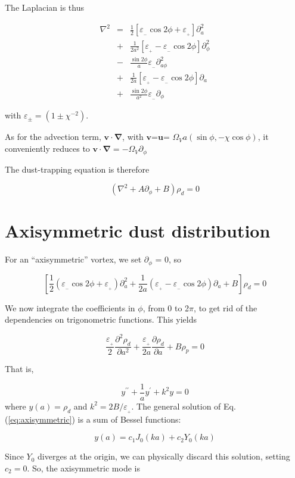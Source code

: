 \documentclass[apj]{emulateapj}
\newcommand{\pderiv}[2]{\frac{\partial #1}{\partial #2}}
\newcommand{\pderivn}[3]{\frac{\partial^{#3} #1}{\partial #2^{#3}}}
\renewcommand{\v}[1]{{\boldsymbol{#1}}} %
\newcommand{\del}{\v{\nabla}}
\newcommand{\grad}{\del}
\newcommand{\Laplace}{\nabla^2}
\newcommand{\Eq}[1]{Eq. (\ref{#1})}
\newcommand{\eq}[1]{\Eq{#1}}
\newcommand{\beq}{\begin{equation}}
\newcommand{\eeq}{\end{equation}}
\newcommand{\beqn}{\begin{eqnarray}}
\newcommand{\eeqn}{\end{eqnarray}}
\newcommand{\epsp}{\varepsilon_{_{+}}}
\newcommand{\epsm}{\varepsilon_{_{-}}}
\begin{document}
The Laplacian is thus 

\beqn
\Laplace{} &= &\frac{1}{2}\left[ \epsm \cos 2\phi + \epsp\right] \partial^2_a  \\
                &+& \frac{1}{2a^2}\left[ \epsp - \epsm \cos 2\phi\right] \partial^2_\phi  \\
                &-& \frac{\sin 2\phi}{a}\epsm \partial^2_{a\phi}  \\
                &+& \frac{1}{2a}\left[ \epsp - \epsm \cos 2\phi\right] \partial_a  \\
                &+& \frac{\sin 2\phi}{a^2} \epsm\partial_\phi
\eeqn

with $\varepsilon_{\pm} = (1 \pm \chi^{-2})$. 

As for the advection term, $\v{v}\cdot\grad$, with $\v{v}$=$\v{u}$=
$\varOmega_V a(\sin\phi,-\chi\cos\phi)$, it conveniently reduces to  $\v{v}\cdot\grad=  -\varOmega_V \partial_\phi $

The dust-trapping equation is therefore 

\beq \label{eq:dust-trapping-uvzero}
\left(\Laplace{} + A\partial_\phi + B\right) \rho_d = 0 
\eeq

\section{Axisymmetric dust distribution}

For an ``axisymmetric'' vortex, we set $\partial_\phi$ = 0, so 

\beq
\left[\frac{1}{2}\left( \epsm \cos 2\phi +\epsp\right) \partial^2_a   + \frac{1}{2a}\left( \epsp - \epsm\cos 2\phi\right) \partial_a  + B\right] \rho_d = 0 
\eeq

We now integrate the coefficients in $\phi$, from 0 to 2$\pi$, to get
rid of the dependencies on trigonometric functions. This yields

\beq
\frac{\epsp}{2}\pderivn{\rho_d}{a}{2} +
\frac{\epsp}{2a}\pderiv{\rho_d}{a} + B \rho_p = 0  
\eeq

That is, 

\beq
y^{\prime\prime} + \frac{1}{a}y^\prime + k^2 y = 0 
\label{eq:axisymmetric}
\eeq where $y(a) = \rho_d$ and $k^2 = 2B/\epsp$.  The general solution of \eq{eq:axisymmetric} is a
sum of Bessel functions: 

\beq
y(a) = c_1 J_0 (ka) + c_2 Y_0(ka) 
\eeq

Since  $Y_0$ diverges at the origin, we can physically discard 
this solution, setting $c_2=0$. So, the axisymmetric mode is
\end{document}
